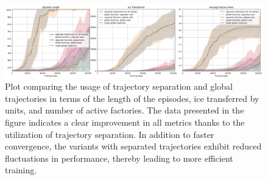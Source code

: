 \begin{figure}[htbp]
    \centering
    \includegraphics[width=1\linewidth]{images/results_hybrid/trajectory_separation/combined.png}
    \captionsetup{justification=justified, singlelinecheck=false, width=1\linewidth, labelfont=bf} 
    \caption[]{Plot comparing the usage of trajectory separation and global trajectories in terms of the length of the episodes, ice transferred by units, and number of active factories. The data presented in the figure indicates a clear improvement in all metrics thanks to the utilization of trajectory separation. In addition to faster convergence, the variants with separated trajectories exhibit reduced fluctuations in performance, thereby leading to more efficient training.}
    \label{fig:hybrid_results/trajectory_separation/combined}
\end{figure}

